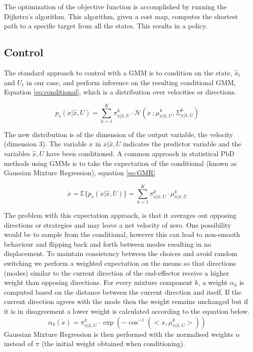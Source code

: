The optimization of the objective function is accomplished by running the Dijkstra's algorithm. This algorithm, given a cost map, 
computes the shortest path to a specific target from all the states. This results in a policy.

\subsection{Control}
The standard approach to control with a GMM is to condition on the state,
$\hat{x}_t$ and $U_t$ in our case, and perform inference on the resulting conditional
GMM, Equation \ref{eq:conditional}, which is a distribution over velocities or directions.

\begin{equation} \label{eq:conditional}
  p_s(\dot{x}|\hat{x},U) = \sum\limits_{k=1}^{K} \pi^{k}_{\dot{x}|\hat{x},U} \cdot  \mathcal{N}\left(\dot{x}\: ;  \mu^{k}_{\dot{x}|\hat{x},U}, \Sigma^{k}_{\dot{x}|\hat{x},U} \right)
\end{equation}

The new distribution is of the dimension of the output variable, the velocity (dimension 3). 
The variable $\dot{x}$ in $\dot{x}|\hat{x},U$ indicates the predictor variable and the variables $\hat{x},U$ have been conditioned.
A common approach in statistical PbD methods using GMMs is to take the expectation of the conditional (known as Gaussian Mixture Regression), equation \ref{eq:GMR}

\begin{equation} \label{eq:GMR}
 \dot{x} = \mathbb{E}\{p_s(\dot{x}|\hat{x},U)\} = \sum\limits_{k=1}^{K}  \pi^{k}_{\dot{x}|\hat{x},U} \cdot \mu^{k}_{\dot{x}|\hat{x},U}
\end{equation}

The problem with this expectation approach, is that it averages out opposing directions or strategies and may leave 
a net velocity of zero. One possibility would be to sample from the conditional, however this can lead to non-smooth 
behaviour and flipping back and forth between modes resulting in no displacement. To maintain consistency between the
choices and avoid random switching  we perform a weighted expectation on the means so that 
directions (modes) similar to the current direction of the end-effector receive
a higher weight than opposing directions. For every mixture component $k$, a weight $\alpha_k$ is computed based 
on the distance between the current direction and itself.
If the current direction agrees with the mode then the weight remains unchanged but if it is in
disagreement a lower weight is
calculated according to the equation below. 
\begin{equation}  \label{eq:weight}
  \alpha_{k}(\dot{x}) = \pi^{k}_{\dot{x}|\hat{x},U} \cdot \exp(-\cos^{-1}(<\dot{x},\mu^{k}_{\dot{x}|\hat{x},U}>))
\end{equation}
Gaussian Mixture Regression is then performed with the normalised  weights $\alpha$ instead of $\pi$
(the initial weight obtained when conditioning).

